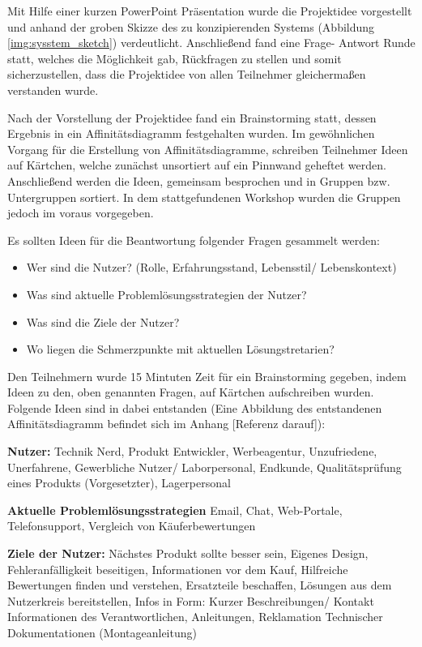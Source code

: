 Mit Hilfe einer kurzen PowerPoint Präsentation wurde die Projektidee vorgestellt und anhand der groben Skizze des zu konzipierenden Systems (Abbildung \ref{img:sysstem_sketch}) verdeutlicht. 
Anschließend fand eine Frage- Antwort Runde statt, welches die Möglichkeit gab, Rückfragen zu stellen und somit sicherzustellen, dass die Projektidee von allen Teilnehmer gleichermaßen verstanden wurde. 

Nach der Vorstellung der Projektidee fand ein Brainstorming statt, dessen Ergebnis in ein Affinitätsdiagramm festgehalten wurden. 
Im gewöhnlichen Vorgang für die Erstellung von Affinitätsdiagramme, schreiben Teilnehmer Ideen auf Kärtchen, welche zunächst unsortiert auf ein Pinnwand geheftet werden. 
Anschließend werden die Ideen, gemeinsam besprochen und in Gruppen bzw. Untergruppen sortiert. In dem stattgefundenen Workshop wurden die Gruppen jedoch im voraus vorgegeben. 

Es sollten Ideen für die Beantwortung folgender Fragen gesammelt werden: 

\begin{itemize}
	\item Wer sind die Nutzer? (Rolle, Erfahrungsstand,  Lebensstil/ Lebenskontext)
	\item Was sind aktuelle Problemlösungsstrategien der Nutzer?
	\item Was sind die Ziele der Nutzer?
	\item Wo liegen die Schmerzpunkte mit aktuellen Lösungstretarien?
\end{itemize}\label{list:AffiDiagramm}

Den Teilnehmern wurde 15 Mintuten Zeit für ein Brainstorming gegeben, indem Ideen zu den, oben genannten Fragen, auf Kärtchen aufschreiben wurden.
Folgende Ideen sind in dabei entstanden (Eine Abbildung des entstandenen Affinitätsdiagramm befindet sich im Anhang [Referenz darauf]): 

\vspace{5mm}
\textbf{Nutzer: } 
Technik Nerd, Produkt Entwickler, Werbeagentur, Unzufriedene, Unerfahrene, Gewerbliche Nutzer/ Laborpersonal, Endkunde, Qualitätsprüfung eines Produkts (Vorgesetzter), Lagerpersonal

\vspace{5mm}
\textbf{Aktuelle Problemlösungsstrategien} 
Email, Chat, Web-Portale, Telefonsupport, Vergleich von Käuferbewertungen

\vspace{5mm}
\textbf{Ziele der Nutzer: } 
Nächstes Produkt sollte besser sein, Eigenes Design, Fehleranfälligkeit beseitigen, Informationen vor dem Kauf, Hilfreiche Bewertungen finden und verstehen, Ersatzteile beschaffen, Lösungen aus dem Nutzerkreis bereitstellen, Infos in Form: Kurzer Beschreibungen/ Kontakt Informationen des Verantwortlichen, Anleitungen, Reklamation Technischer Dokumentationen (Montageanleitung)

